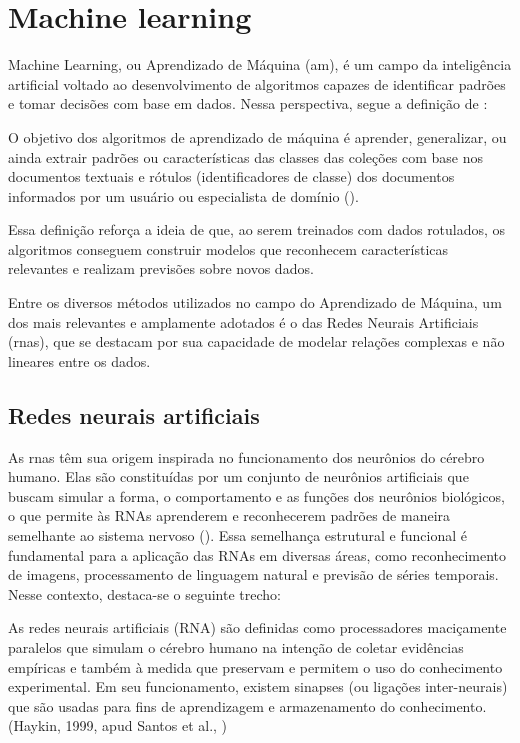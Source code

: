 \section{Machine learning} 

Machine Learning, ou Aprendizado de Máquina (\acrshort{am}), é um campo da inteligência artificial voltado ao desenvolvimento de algoritmos capazes de identificar padrões e tomar decisões com base em dados. Nessa perspectiva, segue a definição de :
\begin{citacao}
O objetivo dos algoritmos de aprendizado de máquina é aprender, generalizar, ou ainda extrair padrões ou características das classes das coleções com base nos documentos textuais e rótulos (identificadores de classe) dos documentos informados por um usuário ou especialista de domínio ().
\end{citacao}

Essa definição reforça a ideia de que, ao serem treinados com dados rotulados, os algoritmos conseguem construir modelos que reconhecem características relevantes e realizam previsões sobre novos dados.


Entre os diversos métodos utilizados no campo do Aprendizado de Máquina, um dos mais relevantes e amplamente adotados é o das Redes Neurais Artificiais (\glspl{rna}), que se destacam por sua capacidade de modelar relações complexas e não lineares entre os dados.

\subsection{Redes neurais artificiais}

As \glspl{rna} têm sua origem inspirada no funcionamento dos neurônios do cérebro humano. Elas são constituídas por um conjunto de neurônios artificiais que buscam simular a forma, o comportamento e as funções dos neurônios biológicos, o que permite às RNAs aprenderem e reconhecerem padrões de maneira semelhante ao sistema nervoso (). Essa semelhança estrutural e funcional é fundamental para a aplicação das RNAs em diversas áreas, como reconhecimento de imagens, processamento de linguagem natural e previsão de séries temporais. Nesse contexto, destaca-se o seguinte trecho:

\begin{citacao}
As redes neurais artificiais (RNA) são definidas como processadores maciçamente paralelos que simulam o cérebro humano na intenção de coletar evidências empíricas e também à medida que preservam e permitem o uso do conhecimento experimental. Em seu funcionamento, existem sinapses (ou ligações inter-neurais) que são usadas para fins de aprendizagem e armazenamento do conhecimento. (Haykin, 1999, apud Santos et al., \citeyear{santos2016aplicaccao})

\end{citacao}

